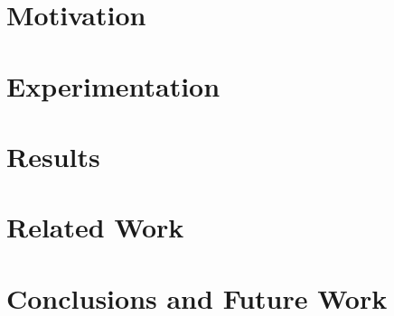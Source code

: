 \documentclass{llncs}
\begin{document}
\section{Motivation}
\label{sec:motivation}


\section{Experimentation}
\label{sec:method}

\section{Results}
\label{sec:results}
 

\section{Related Work}
\label{sec:related}


\section{Conclusions and Future Work}
\label{sec:conclusion}




%



\end{document}
